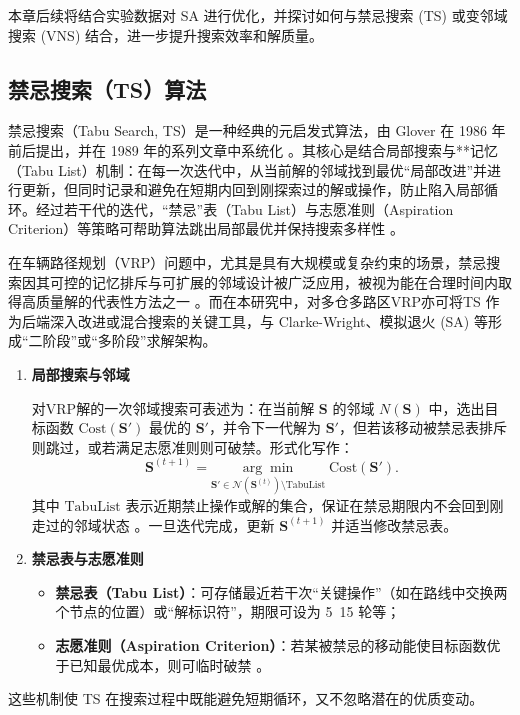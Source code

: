 \documentclass[12pt,a4paper,twoside]{ctexbook}
\begin{document}
本章后续将结合实验数据对 SA 进行优化，并探讨如何与禁忌搜索 (TS) 或变邻域搜索 (VNS) 结合，进一步提升搜索效率和解质量。

\subsection{禁忌搜索（TS）算法}

禁忌搜索（Tabu Search, TS）是一种经典的元启发式算法，由 Glover 在 1986 年前后提出，并在 1989 年的系列文章中系统化 \cite{glover1986tabu}。其核心是结合局部搜索与**记忆（Tabu List）机制：在每一次迭代中，从当前解的邻域找到最优“局部改进”并进行更新，但同时记录和避免在短期内回到刚探索过的解或操作，防止陷入局部循环。经过若干代的迭代，“禁忌”表（Tabu List）与志愿准则（Aspiration Criterion）等策略可帮助算法跳出局部最优并保持搜索多样性 \cite{glover1989advances}。

在车辆路径规划（VRP）问题中，尤其是具有大规模或复杂约束的场景，禁忌搜索因其可控的记忆排斥与可扩展的邻域设计被广泛应用，被视为能在合理时间内取得高质量解的代表性方法之一 \cite{laporte2000tabu}。而在本研究中，对多仓多路区VRP亦可将TS 作为后端深入改进或混合搜索的关键工具，与 Clarke-Wright、模拟退火 (SA) 等形成“二阶段”或“多阶段”求解架构。
\begin{enumerate}
    \item \textbf{局部搜索与邻域}

    对VRP解的一次邻域搜索可表述为：在当前解 $\mathbf{S}$ 的邻域 $N(\mathbf{S})$ 中，选出目标函数 $\text{Cost}(\mathbf{S}')$ 最优的 $\mathbf{S}'$，并令下一代解为 $\mathbf{S}'$，但若该移动被禁忌表排斥则跳过，或若满足志愿准则则可破禁。形式化写作：
    \[
    \mathbf{S}^{(t+1)} = \underset{\mathbf{S}' \in \mathcal{N}(\mathbf{S}^{(t)}) \setminus \mathrm{TabuList}}{\arg\min}\; \mathrm{Cost}(\mathbf{S}').
    \]
    其中 $\mathrm{TabuList}$ 表示近期禁止操作或解的集合，保证在禁忌期限内不会回到刚走过的邻域状态 \cite{laporte2000tabu}。一旦迭代完成，更新 $\mathbf{S}^{(t+1)}$ 并适当修改禁忌表。

    \item \textbf{禁忌表与志愿准则}

    \begin{itemize}
        \item \textbf{禁忌表（Tabu List）}：可存储最近若干次“关键操作”（如在路线中交换两个节点的位置）或“解标识符”，期限可设为 5~15 轮等；
        \item \textbf{志愿准则（Aspiration Criterion）}：若某被禁忌的移动能使目标函数优于已知最优成本，则可临时破禁 \cite{glover1989tabu}。
    \end{itemize}
\end{enumerate}
    这些机制使 TS 在搜索过程中既能避免短期循环，又不忽略潜在的优质变动。
\end{document}
